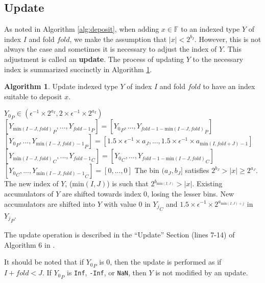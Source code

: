 \documentclass[12pt]{article}
\providecommand{\F}{\ensuremath{\mathbb{F}}}
\providecommand{\min}{\ensuremath{\text{min}}}
\theoremstyle{definition}
\newtheorem{alg}{Algorithm}[section]
\numberwithin{equation}{section}
\begin{document}
  \subsection{Update}
    \label{sec:basicops_update}
    As noted in Algorithm \ref{alg:deposit}, when adding $x \in \F$ to an indexed type $Y$ of index $I$ and fold $fold$, we make the assumption that $|x| < 2^{b_I}$. However, this is not always the case and sometimes it is necessary to adjust the index of $Y$. This adjustment is called an \textbf{update}. The process of updating $Y$ to the necessary index is summarized succinctly in Algorithm \ref{alg:update}.
    \begin{alg}
      Update indexed type $Y$ of index $I$ and fold $fold$ to have an index suitable to deposit $x$.
      \begin{algorithmic}[1]
        \Require
          \Statex ${Y_0}_P \in (\epsilon^{-1} \times 2^{a_{I}}, 2 \times \epsilon^{-1} \times 2^{a_I})$
          \State {}
          \State {}
            \State $[{Y_{\min(I - J, fold)}}_P, ..., {Y_{fold - 1}}_P] = [{Y_0}_P, ..., {Y_{fold - 1 - \min(I - J, fold)}}_P]$
            \State $[{Y_0}_P, ..., {Y_{\min(I - J, fold) - 1}}_P] = [1.5 \times \epsilon^{-1} \times a_{J}, ..., 1.5 \times \epsilon^{-1} \times a_{\min(I, fold + J) - 1}]$
            \State $[{Y_{\min(I - J, fold)}}_C, ..., {Y_{fold - 1}}_C] = [{Y_0}_C, ..., {Y_{fold - 1 - \min(I - J, fold)}}_C]$
            \State $[{Y_0}_C, ..., {Y_{\min(I - J, fold) - 1}}_C] = [0, ..., 0]$
          \EndIf
        \EndFunction
        \Ensure
          \Statex The bin $(a_{J}, b_{J}]$ satisfies $2^{b_{J}} > |x| \geq 2^{a_{J}}$.
          \Statex The new index of $Y$, ($\min(I, J)$) is such that $2^{b_{\min(I, J)}} > |x|$.
          \Statex Existing accumulators of $Y$ are shifted towards index $0$, losing the lesser bins.
          \Statex New accumulators are shifted into $Y$ with value $0$ in ${Y_j}_C$ and $1.5 \times \epsilon^{-1} \times 2^{a_{\min(I, J) + j}}$ in ${Y_j}_P$.
      \end{algorithmic}
      \label{alg:update}
    \end{alg}
    The update operation is described in the ``Update'' Section (lines 7-14) of Algorithm $6$ in \cite{repsum}.

    It should be noted that if ${Y_0}_P$ is 0, then the update is performed as if $I + fold < J$. If ${Y_0}_P$ is \verb|Inf|, \verb|-Inf|, or \verb|NaN|, then $Y$ is not modified by an update.
\end{document}
